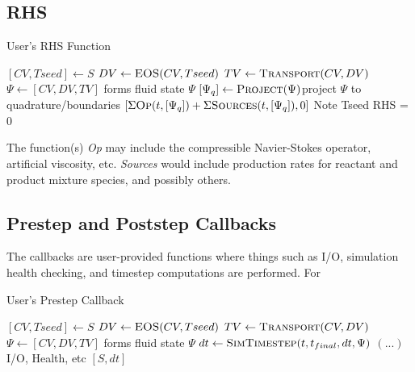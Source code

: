 \documentclass{article}
\begin{document}
\subsection{RHS}
\begin{algorithm}
  \caption{User's RHS Function}
  \begin{algorithmic}[1]
    \State $[CV, Tseed] \gets S$
    \State $DV \gets \Call{EOS}{CV, Tseed}$
    \State $TV \gets \Call{Transport}{CV, DV}$
    \State $\Psi \gets [CV, DV, TV]$ \Comment forms fluid state $\Psi$
    \State $[\Psi_q] \gets \Call{Project}{\Psi}$\Comment project $\Psi$ to quadrature/boundaries
    \State \Return $[\Sigma\Call{Op}{t, [\Psi_q]} + \Sigma\Call{Sources}{t, [\Psi_q]}, 0]$ \Comment Note Tseed RHS = 0
    \EndProcedure  \end{algorithmic}
\end{algorithm}

The function(s) \textit{Op} may include the compressible Navier-Stokes operator, artificial viscosity, etc. \textit{Sources} would include production rates for reactant and product mixture species, and possibly others.

\subsection{Prestep and Poststep Callbacks}
The callbacks are user-provided functions where things such as I/O, simulation health checking, and timestep computations are performed. For 

\begin{algorithm}
  \caption{User's Prestep Callback}
  \begin{algorithmic}[1]
    \State $[CV, Tseed] \gets S$
    \State $DV \gets \Call{EOS}{CV, Tseed}$
    \State $TV \gets \Call{Transport}{CV, DV}$
    \State $\Psi \gets [CV, DV, TV]$ \Comment forms fluid state $\Psi$
    \State $dt \gets \Call{SimTimestep}{t, t_{final}, dt, \Psi}$
    \Statex $ ( ... )$ \Comment I/O, Health, etc
    \State \Return $[S, dt]$
    \EndProcedure  \end{algorithmic}
\end{algorithm}
\end{document}
